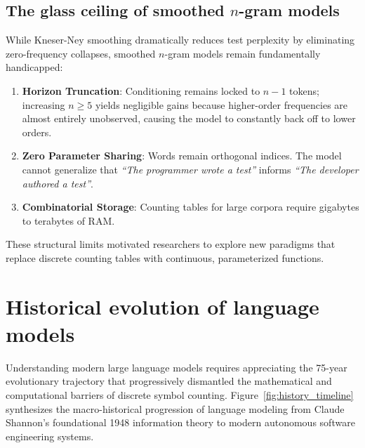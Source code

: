 \documentclass[../../main.tex]{subfiles}
\begin{document}
\subsection{The glass ceiling of smoothed \texorpdfstring{$n$}{n}-gram models}
While Kneser-Ney smoothing dramatically reduces test perplexity by eliminating zero-frequency collapses, smoothed $n$-gram models remain fundamentally handicapped:
\begin{enumerate}
    \item \textbf{Horizon Truncation}: Conditioning remains locked to $n-1$ tokens; increasing $n \ge 5$ yields negligible gains because higher-order frequencies are almost entirely unobserved, causing the model to constantly back off to lower orders.
    \item \textbf{Zero Parameter Sharing}: Words remain orthogonal indices. The model cannot generalize that \textit{``The programmer wrote a test''} informs \textit{``The developer authored a test''}.
    \item \textbf{Combinatorial Storage}: Counting tables for large corpora require gigabytes to terabytes of RAM.
\end{enumerate}
These structural limits motivated researchers to explore new paradigms that replace discrete counting tables with continuous, parameterized functions.


\clearpage
\section{Historical evolution of language models}
\label{sec:history_lms}

Understanding modern large language models requires appreciating the 75-year evolutionary trajectory that progressively dismantled the mathematical and computational barriers of discrete symbol counting. Figure~\ref{fig:history_timeline} synthesizes the macro-historical progression of language modeling from Claude Shannon's foundational 1948 information theory to modern autonomous software engineering systems.
\end{document}
